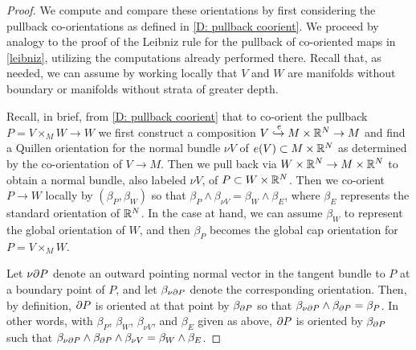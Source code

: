 \begin{proof}
	We compute and compare these orientations by first considering the pullback co-orientations as defined in \cref{D: pullback coorient}.
	We proceed by analogy to the proof of the Leibniz rule for the pullback of co-oriented maps in \cref{leibniz}, utilizing the computations already performed there.
	Recall that, as needed, we can assume by working locally that $V$ and $W$ are manifolds without boundary or manifolds without strata of greater depth.

	Recall, in brief, from \cref{D: pullback coorient} that to co-orient the pullback $P = V \times_M W \to W$ we first construct a composition $V \xhookrightarrow{e} M \times \mathbb{R}^N \to M$ and find a Quillen orientation for the normal bundle $\nu V$ of $e(V) \subset M \times \mathbb{R}^N$ as determined by the co-orientation of $V \to M$.
	Then we pull back via $W \times \mathbb{R}^N \to M \times \mathbb{R}^N$ to obtain a normal bundle, also labeled $\nu V$, of $P \subset W \times \mathbb{R}^N$.
	Then we co-orient $P \to W$ locally by $(\beta_P,\beta_W)$ so that $\beta_P \wedge \beta_{\nu V} = \beta_W \wedge \beta_E$, where $\beta_E$ represents the standard orientation of $\mathbb{R}^N$.
	In the case at hand, we can assume $\beta_W$ to represent the global orientation of $W$, and then $\beta_P$ becomes the global cap orientation for $P = V \times_M W$.

	Let $\nu\partial P$ denote an outward pointing normal vector in the tangent bundle to $P$ at a boundary point of $P$, and let $\beta_{\nu\partial P}$ denote the corresponding orientation.
	Then, by definition, $\partial P$ is oriented at that point by $\beta_{\partial P}$ so that $\beta_{\nu\partial P} \wedge \beta_{\partial P} = \beta_P$.
	In other words, with $\beta_P$, $\beta_W$, $\beta_{\nu V}$, and $\beta_E$ given as above, $\partial P$ is oriented by $\beta_{\partial P}$ such that $\beta_{\nu\partial P} \wedge \beta_{\partial P} \wedge \beta_{\nu V} = \beta_W \wedge \beta_E$.


\end{proof}
